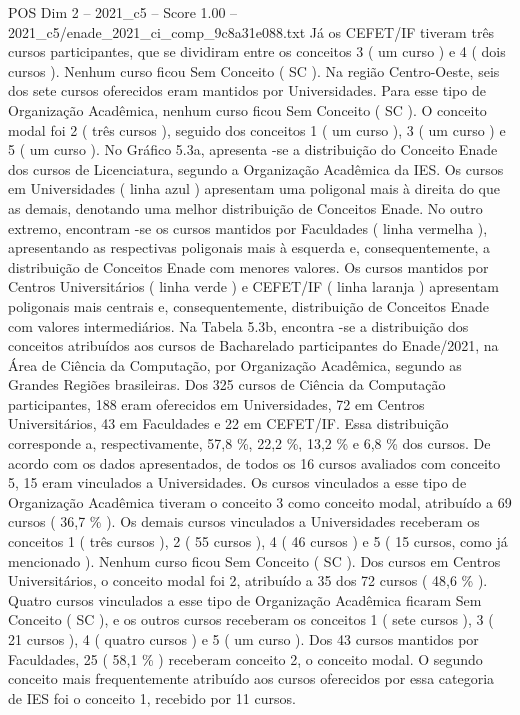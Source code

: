 \begin{textsample}{POS Dim 2 – 2021\_c5 – Score 1.00 – 2021\_c5/enade\_2021\_ci\_comp\_9c8a31e088.txt}
Já os CEFET/IF tiveram três cursos participantes, que se dividiram entre os conceitos 3 ( um curso ) e 4 ( dois cursos ).
Nenhum curso ficou Sem Conceito ( SC ).
Na região Centro-Oeste, seis dos sete cursos oferecidos eram mantidos por Universidades.
Para esse tipo de Organização Acadêmica, nenhum curso ficou Sem Conceito ( SC ).
O conceito modal foi 2 ( três cursos ), seguido dos conceitos 1 ( um curso ), 3 ( um curso ) e 5 ( um curso ).
No Gráfico 5.3a, apresenta -se a distribuição do Conceito Enade dos cursos de Licenciatura, segundo a Organização Acadêmica da IES.
Os cursos em Universidades ( linha azul ) apresentam uma poligonal mais à direita do que as demais, denotando uma melhor distribuição de Conceitos Enade.
No outro extremo, encontram -se os cursos mantidos por Faculdades ( linha vermelha ), apresentando as respectivas poligonais mais à esquerda e, consequentemente, a distribuição de Conceitos Enade com menores valores.
Os cursos mantidos por Centros Universitários ( linha verde ) e CEFET/IF ( linha laranja ) apresentam poligonais mais centrais e, consequentemente, distribuição de Conceitos Enade com valores intermediários.
Na Tabela 5.3b, encontra -se a distribuição dos conceitos atribuídos aos cursos de Bacharelado participantes do Enade/2021, na Área de Ciência da Computação, por Organização Acadêmica, segundo as Grandes Regiões brasileiras.
Dos 325 cursos de Ciência da Computação participantes, 188 eram oferecidos em Universidades, 72 em Centros Universitários, 43 em Faculdades e 22 em CEFET/IF.
Essa distribuição corresponde a, respectivamente, 57,8 \%, 22,2 \%, 13,2 \% e 6,8 \% dos cursos.
De acordo com os dados apresentados, de todos os 16 cursos avaliados com conceito 5, 15 eram vinculados a Universidades.
Os cursos vinculados a esse tipo de Organização Acadêmica tiveram o conceito 3 como conceito modal, atribuído a 69 cursos ( 36,7 \% ).
Os demais cursos vinculados a Universidades receberam os conceitos 1 ( três cursos ), 2 ( 55 cursos ), 4 ( 46 cursos ) e 5 ( 15 cursos, como já mencionado ).
Nenhum curso ficou Sem Conceito ( SC ).
Dos cursos em Centros Universitários, o conceito modal foi 2, atribuído a 35 dos 72 cursos ( 48,6 \% ).
Quatro cursos vinculados a esse tipo de Organização Acadêmica ficaram Sem Conceito ( SC ), e os outros cursos receberam os conceitos 1 ( sete cursos ), 3 ( 21 cursos ), 4 ( quatro cursos ) e 5 ( um curso ).
Dos 43 cursos mantidos por Faculdades, 25 ( 58,1 \% ) receberam conceito 2, o conceito modal.
O segundo conceito mais frequentemente atribuído aos cursos oferecidos por essa categoria de IES foi o conceito 1, recebido por 11 cursos.

\end{textsample}
